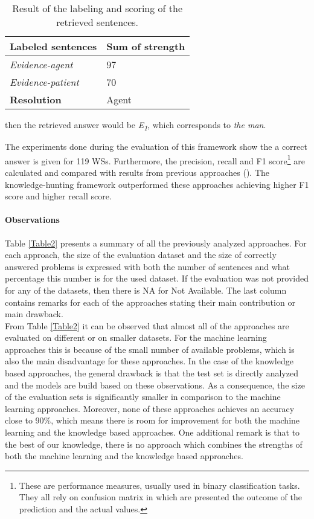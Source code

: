 \begin{enumerate}
\begin{table}[h!]
\begin{center}
		\begin{tabular}{l | l}
			\textbf{Labeled sentences} & \textbf{Sum of strength} \\\hline
			\textit{Evidence-agent} & 97 \\\hline
			\textit{Evidence-patient} & 70 \\\hline
			\textbf{Resolution} & Agent
		\end{tabular}
			\caption{{\label{TableEmami4}}Result of the labeling and scoring of the retrieved sentences.}
	\end{center}
	\end{table}
	then the retrieved answer would be \textit{E\textsubscript{1}}, which corresponds to \textit{the man}.

	
\end{enumerate}

 The experiments done during the evaluation of this framework show the a correct answer is given for 119 WSs. Furthermore, the precision, recall and F1 score\footnote{These are performance measures, usually used in binary classification tasks. They all rely on confusion matrix in which are presented the outcome of the prediction and the actual values.} are calculated and compared with results from previous approaches (\cite{DBLP:conf/aaai/SharmaB16, DBLP:conf/aaaiss/LiuJLZWH17}). The knowledge-hunting framework outperformed these approaches achieving higher F1 score and higher recall score.

\paragraph{Observations} 
Table \ref{Table2} presents a summary of all the previously analyzed approaches. For each approach, the size of the evaluation dataset and the size of correctly answered problems is expressed with both the number of sentences and what percentage this number is for the used dataset. If the evaluation was not provided for any of the datasets, then there is NA for Not Available. The last column contains remarks for each of the approaches stating their main contribution or main drawback. \\ 
From Table \ref{Table2} it can be observed that almost all of the approaches are evaluated on different or on smaller datasets. 
For the machine learning approaches this is because of the small number of available problems, which is also the main disadvantage for these approaches. 
In the case of the knowledge based approaches, the general drawback is that the test set is directly analyzed and the models are build based on these observations. As a consequence, the size of the evaluation sets is significantly smaller in comparison to the machine learning approaches. Moreover, none of these approaches achieves an accuracy close to 90\%, which means there is room for improvement for both the machine learning and the knowledge based approaches. One additional remark is that to the best of our knowledge, there is no approach which combines the strengths of both the machine learning and the knowledge based approaches. \\


